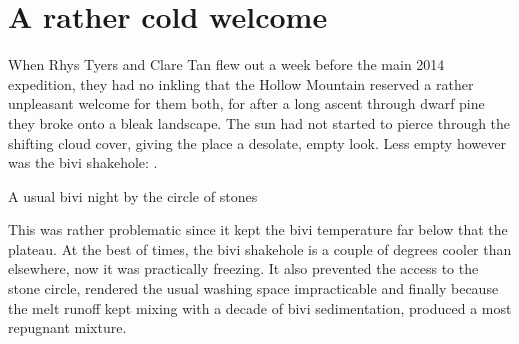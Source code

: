

\section{A rather cold welcome}

When Rhys Tyers and Clare Tan flew out a week before the main 2014 expedition, they had no inkling that the Hollow Mountain reserved a rather unpleasant welcome for them both, for after a long ascent through dwarf pine they broke onto a bleak landscape. The sun had not started to pierce through the shifting cloud cover, giving the place a desolate, empty look. Less empty however was the bivi shakehole: .


\begin{marginfigure}
\caption{A usual bivi night by the circle of stones } \label{}
\end{marginfigure}
This was rather problematic since it kept the bivi temperature far below that the plateau. At the best of times, the bivi shakehole is a couple of degrees cooler than elsewhere, now it was practically freezing. It also prevented the access to the stone circle, rendered the usual washing space impracticable and finally because the melt runoff kept mixing with a decade of bivi sedimentation, produced a most repugnant mixture.

